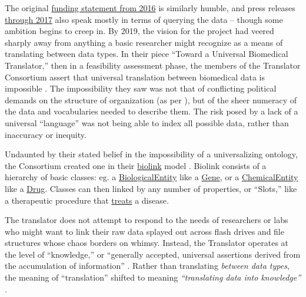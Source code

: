 The original
\href{https://web.archive.org/web/20210709100523/https://ncats.nih.gov/news/releases/2016/feasibility-assessment-translator}{funding
statement from 2016} is similarly humble, and press releases
\href{https://web.archive.org/web/20210709171335/https://ncats.nih.gov/pubs/features/translator}{through
2017} also speak mostly in terms of querying the data -- though some
ambition begins to creep in. By 2019, the vision for the project had
veered sharply away from anything a basic researcher might recognize as
a means of translating between data types. In their piece ``Toward a
Universal Biomedical Translator,'' then in a feasibility assessment
phase, the members of the Translator Consortium assert that universal
translation between biomedical data is impossible \citep{consortiumUniversalBiomedicalData2019} . The
impossibility they saw was not that of conflicting political demands on
the structure of organization (as per \citep{bowkerSortingThingsOut1999} ), but of the sheer numeracy of the data
and vocabularies needed to describe them. The risk posed by a lack of a
universal ``language'' was not being able to index all possible data,
rather than inaccuracy or inequity.

Undaunted by their stated belief in the impossibility of a
universalizing ontology, the Consortium created one in their
\href{https://biolink.github.io/biolink-model/docs/}{biolink} model \citep{bruskiewichBiolinkBiolinkmodel2021, unniBiolinkModelUniversal2022} . Biolink consists of a hierarchy of basic classes: eg. a
\href{https://biolink.github.io/biolink-model/docs/BiologicalEntity.html}{BiologicalEntity}
like a
\href{https://biolink.github.io/biolink-model/docs/Gene.html}{Gene}, or
a
\href{https://biolink.github.io/biolink-model/docs/ChemicalEntity.html}{ChemicalEntity}
like a
\href{https://biolink.github.io/biolink-model/docs/Drug.html}{Drug}.
Classes can then linked by any number of properties, or ``Slots,'' like
a therapeutic procedure that
\href{https://biolink.github.io/biolink-model/docs/treats.html}{treats}
a disease.

The translator does not attempt to respond to the needs of researchers
or labs who might want to link their raw data splayed out across flash
drives and file structures whose chaos borders on whimsy. Instead, the
Translator operates at the level of ``knowledge,'' or ``generally
accepted, universal assertions derived from the accumulation of
information'' \citep{fechoProgressUniversalBiomedical2022} .
Rather than translating \emph{between data types}, the meaning of
``translation'' shifted to meaning \emph{``translating data into
knowledge''} \citep{consortiumUniversalBiomedicalData2019} .


